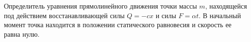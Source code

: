 Определитель уравнения прямолинейного движения точки массы $m$, находящейся
под действием восстанавливающей силы $Q=-cx$ и силы $F=\alpha t$. В начальный
момент точка находится в положении статического равновесия и скорость ее
равна нулю.
